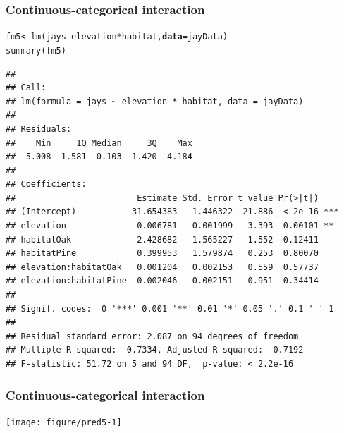 \documentclass[color=usenames,dvipsnames]{beamer}\usepackage[]{graphicx}\usepackage[]{color}
\makeatletter
\newcommand{\hlopt}[1]{\textcolor[rgb]{0,0,0}{#1}}%
\newcommand{\hlstd}[1]{\textcolor[rgb]{0,0,0}{#1}}%
\newcommand{\hlkwb}[1]{\textcolor[rgb]{0,0.341,0.682}{#1}}%
\newcommand{\hlkwc}[1]{\textcolor[rgb]{0,0,0}{\textbf{#1}}}%
\newcommand{\hlkwd}[1]{\textcolor[rgb]{0.004,0.004,0.506}{#1}}%
\newenvironment{kframe}{%
 \def\at@end@of@kframe{}%
 \ifinner\ifhmode%
  \def\at@end@of@kframe{\end{minipage}}%
  \begin{minipage}{\columnwidth}%
 \fi\fi%
 \def\FrameCommand##1{\hskip\@totalleftmargin \hskip-\fboxsep
 \colorbox{shadecolor}{##1}\hskip-\fboxsep
     \hskip-\linewidth \hskip-\@totalleftmargin \hskip\columnwidth}%
 \MakeFramed {\advance\hsize-\width
   \@totalleftmargin\z@ \linewidth\hsize
   \@setminipage}}%
 {\par\unskip\endMakeFramed%
 \at@end@of@kframe}
\newenvironment{knitrout}{}{} %
\makeatother
\begin{document}
\begin{frame}[fragile]
  \frametitle{Continuous-categorical interaction}
\begin{knitrout}\tiny
{}\color{fgcolor}\begin{kframe}
\begin{alltt}
\hlstd{fm5} \hlkwb{<-} \hlkwd{lm}\hlstd{(jays} \hlopt{~} \hlstd{elevation}\hlopt{*}\hlstd{habitat,} \hlkwc{data}\hlstd{=jayData)}
\hlkwd{summary}\hlstd{(fm5)}
\end{alltt}
\begin{verbatim}
## 
## Call:
## lm(formula = jays ~ elevation * habitat, data = jayData)
## 
## Residuals:
##    Min     1Q Median     3Q    Max 
## -5.008 -1.581 -0.103  1.420  4.184 
## 
## Coefficients:
##                        Estimate Std. Error t value Pr(>|t|)    
## (Intercept)           31.654383   1.446322  21.886  < 2e-16 ***
## elevation              0.006781   0.001999   3.393  0.00101 ** 
## habitatOak             2.428682   1.565227   1.552  0.12411    
## habitatPine            0.399953   1.579874   0.253  0.80070    
## elevation:habitatOak   0.001204   0.002153   0.559  0.57737    
## elevation:habitatPine  0.002046   0.002151   0.951  0.34414    
## ---
## Signif. codes:  0 '***' 0.001 '**' 0.01 '*' 0.05 '.' 0.1 ' ' 1
## 
## Residual standard error: 2.087 on 94 degrees of freedom
## Multiple R-squared:  0.7334,	Adjusted R-squared:  0.7192 
## F-statistic: 51.72 on 5 and 94 DF,  p-value: < 2.2e-16
\end{verbatim}
\end{kframe}
\end{knitrout}
\end{frame}




\begin{frame}[fragile]
  \frametitle{Continuous-categorical interaction}
\begin{knitrout}
\color{fgcolor}
\texttt{[image: figure/pred5-1]} 

\end{knitrout}
\end{frame}
\end{document}
